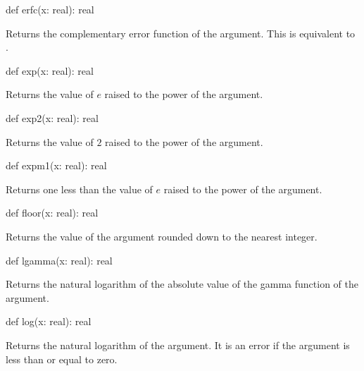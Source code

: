 \begin{protohead}
def erfc(x: real): real
\end{protohead}
\begin{protobody}
Returns the complementary error function of the argument.  This is
equivalent to .
\end{protobody}

\begin{protohead}
def exp(x: real): real
\end{protohead}
\begin{protobody}
Returns the value of $e$ raised to the power of the argument.
\end{protobody}

\begin{protohead}
def exp2(x: real): real
\end{protohead}
\begin{protobody}
Returns the value of $2$ raised to the power of the argument.
\end{protobody}

\begin{protohead}
def expm1(x: real): real
\end{protohead}
\begin{protobody}
Returns one less than the value of $e$ raised to the power of the argument.
\end{protobody}

\begin{protohead}
def floor(x: real): real
\end{protohead}
\begin{protobody}
Returns the value of the argument rounded down to the nearest integer.
\end{protobody}

\begin{protohead}
def lgamma(x: real): real
\end{protohead}
\begin{protobody}
Returns the natural logarithm of the absolute value of the gamma
function of the argument.
\end{protobody}

\begin{protohead}
def log(x: real): real
\end{protohead}
\begin{protobody}
Returns the natural logarithm of the argument.  It is an error if the
argument is less than or equal to zero.
\end{protobody}

